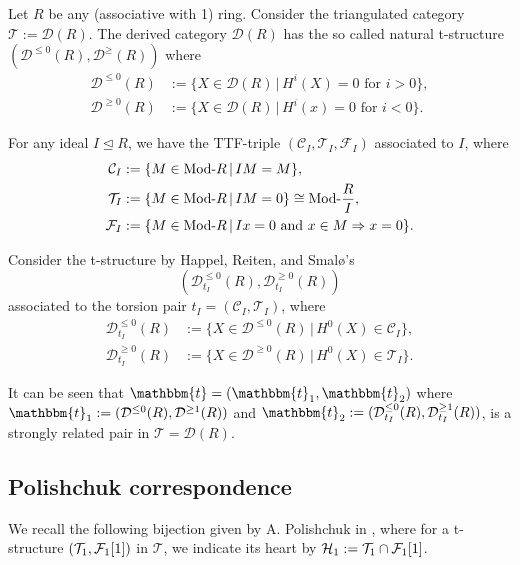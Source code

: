 \begin{example}
  Let $R$ be any (associative with 1) ring. Consider the triangulated category $\mathcal{T}:=\mathcal{D}(R)$.
  The derived category $\mathcal{D}(R)$ has the so called natural t-structure
  $(\mathcal{D}^{\leq 0}(R),\mathcal{D}^{\geq}(R))$ where
  \begin{align*}
    \mathcal{D}^{\leq 0}(R) &:= \{ X\in\mathcal{D}(R) \,|\,H^i(X)=0\text{ for } i>0\},\\
    \mathcal{D}^{\geq 0}(R) &:= \{ X\in\mathcal{D}(R) \,|\,H^i(x)=0\text{ for } i<0\}.
  \end{align*}

  For any ideal $I\trianglelefteq R$, we have the TTF-triple $(\mathcal{C}_I,\mathcal{T}_I,\mathcal{F}_I)$
  associated to $I$, where
  \begin{align*}
    \mathcal{C}_I &:= \{M\in\mathrm{\textup{Mod-}}R\,|\,IM=M\},\\
    \mathcal{T}_I &:= \{M\in\mathrm{\textup{Mod-}}R\,|\,IM=0\}\cong \mathrm{\textup{Mod-}}\frac{R}{I},\\
    \mathcal{F}_I &:= \{M\in\mathrm{\textup{Mod-}}R\,|\,Ix=0\text{ and }x\in M\Rightarrow x=0\}.
  \end{align*}

  Consider the t-structure by Happel, Reiten, and Smal\o's \cite{hrs96} \[(\mathcal{D}^{\leq 0}_{t_I}(R), \mathcal{D}^{\geq 0}_{t_I}(R))\]
  associated to the torsion pair $t_I=(\mathcal{C}_I,\mathcal{T}_I)$, where
  \begin{align*}
    \mathcal{D}^{\leq 0}_{t_I}(R) &:= \{ X\in\mathcal{D}^{\leq 0}(R)\,|\, H^0(X)\in\mathcal{C}_I \},\\
    \mathcal{D}^{\geq 0}_{t_I}(R) &:= \{ X\in\mathcal{D}^{\geq 0}(R)\,|\, H^0(X)\in\mathcal{T}_I \}.
  \end{align*}

  \begin{sloppypar}
  It can be seen that $\mathbbm{t}=(\mathbbm{t}_1,\mathbbm{t}_2)$ where
  $\mathbbm{t}_1:=(\mathcal{D}^{\leq 0}(R),\mathcal{D}^{\geq 1}(R))$ and
  $\mathbbm{t}_2:=(\mathcal{D}^{\leq 0}_{t_I}(R),\mathcal{D}^{\geq 1}_{t_I}(R))$, is a strongly
  related pair in ${\mathcal{T}=\mathcal{D}(R)}$.
\end{sloppypar}
\end{example}

\subsection{Polishchuk correspondence}

\begin{sloppypar}
We recall the following bijection given by A. Polishchuk in \cite{Polishchuk2006}, where
for a t-structure $(\mathcal{T}_1,\mathcal{F}_1[1])$ in $\mathcal{T}$, we indicate its heart by ${\mathcal{H}_1:=\mathcal{T}_1\cap\mathcal{F}_1[1]}$.
\end{sloppypar}

